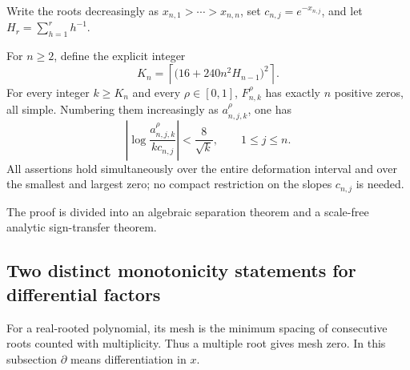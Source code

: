 Write the roots decreasingly as $x_{n,1}>\cdots>x_{n,n}$, set
$c_{n,j}=e^{-x_{n,j}}$, and let $H_r=\sum_{h=1}^r h^{-1}$.

\begin{theorem}
\label{mesh:thm:saturation}
For $n\geq2$, define the explicit integer
\begin{equation}\label{mesh:eq:threshold}
 K_n=\left\lceil\bigl(16+240n^2H_{n-1}\bigr)^2\right\rceil.
\end{equation}
For every integer $k\geq K_n$ and every $\rho\in[0,1]$,
$F_{n,k}^\rho$ has exactly $n$ positive zeros, all simple.
Numbering them increasingly as $a_{n,j,k}^\rho$, one has
\begin{equation}\label{mesh:eq:location}
 \boxed{\left|\log\frac{a_{n,j,k}^\rho}{k c_{n,j}}\right|
          <\frac8{\sqrt{k}},\qquad 1\leq j\leq n.}
\end{equation}
All assertions hold simultaneously over the entire deformation interval
and over the smallest and largest zero; no compact restriction on the
slopes $c_{n,j}$ is needed.
\end{theorem}

The proof is divided into an algebraic separation theorem and a
scale-free analytic sign-transfer theorem.

\subsection{Two distinct monotonicity statements for differential factors}

For a real-rooted polynomial, its mesh is the minimum spacing of
consecutive roots counted with multiplicity. Thus a multiple root gives
mesh zero. In this subsection $\partial$ means differentiation in $x$.


